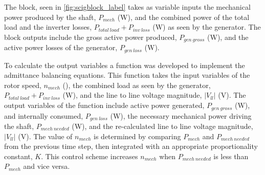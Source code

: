 The block, seen in \autoref{fig:scigblock_label} takes as variable inputs the mechanical power produced by the shaft, $P_{mech}$ (\si{\watt}), and 
the combined power of the total load and the inverter losses, $P_{total\ load} + P_{inv\ loss}$ (\si{\watt}) as seen by the generator. The block outputs include the gross active power produced, $P_{gen\ gross}$ (\si{\watt}), and the active power losses of the generator, $P_{gen\ loss}$ (\si{\watt}).


To calculate the output variables a function was developed to implement the admittance balancing equations. This function takes the input variables of the rotor speed, $n_{mech}$ (\si{\rpm}), the combined load as seen by the generator, $P_{total\ load} + P_{inv\ loss}$ (\si{\watt}), and the line to line voltage magnitude, $\left|V_{ll}\right|$ (\si{\volt}). The output variables of the function include active power generated, $P_{gen\ gross}$ (\si{\watt}), and internally consumed, $P_{gen\ loss}$ (\si{\watt}), 
the necessary mechanical power driving the shaft, $P_{mech\ needed}$ (\si{\watt}), and the re-calculated line to line voltage magnitude, $\left|V_{ll}\right|$ (\si{\volt}). The value of $n_{mech}$ is determined by comparing $P_{mech}$ and $P_{mech\ needed}$ from the previous time step, then integrated with an appropriate proportionality constant, $K$. This control scheme increases $n_{mech}$ when $P_{mech\ needed}$ is less than $P_{mech}$ and vice versa.

